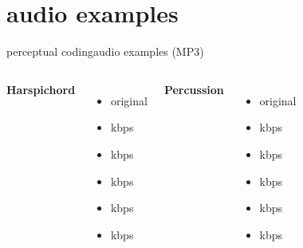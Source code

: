 \section[audio]{audio examples}	
	\begin{frame}{perceptual coding}{audio examples (MP3)}
        \begin{columns}
            \textbf{Harspichord}
                \begin{itemize}
                    \item   original 
                    \item   \unit[256]{kbps} 
                    \item   \unit[128]{kbps} 
                    \item   \unit[96]{kbps} 
                    \item   \unit[64]{kbps} 
                    \item   \unit[32]{kbps} 
                \end{itemize}
            \textbf{Percussion}
                \begin{itemize}
                    \item   original 
                    \item   \unit[256]{kbps} 
                    \item   \unit[128]{kbps} 
                    \item   \unit[96]{kbps} 
                    \item   \unit[64]{kbps} 
                    \item   \unit[32]{kbps} 
                \end{itemize}
        \end{columns}
	\end{frame}

